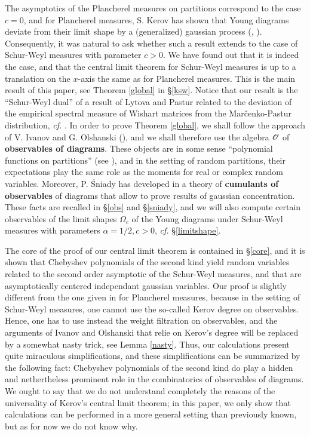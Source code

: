\documentclass[10pt]{amsart}
\begin{document}
The asymptotics of the Plancherel measures on partitions correspond to the case $c=0$, and for Plancherel measures, S. Kerov has shown that Young diagrams deviate from their limit shape by a (generalized) gaussian process (\cite{Ker93}, \cite{IO02}). Consequently, it was natural to ask whether such a result extends to the case of Schur-Weyl measures with parameter $c>0$. We have found out that it is indeed the case, and that the central limit theorem for Schur-Weyl measures is up to a translation on the $x$-axis the same as for Plancherel measures. This is the main result of this paper, see Theorem \ref{global} in \S\ref{ksw}. Notice that our result is the ``Schur-Weyl dual'' of a result of Lytova and Pastur related to the deviation of the empirical spectral measure of Wishart matrices from the Mar\v{c}enko-Pastur distribution, \emph{cf.} \cite{LP09}. In order to prove Theorem \ref{global}, we shall follow the approach of V. Ivanov and G. Olshanski (\cite{IO02}), and we shall therefore use the algebra $\mathscr{O}$ of \textbf{observables of diagrams}. These objects are in some sense ``polynomial functions on partitions'' (see \cite{KO94}), and in the setting of random partitions, their expectations play the same role as the moments for real or complex random variables. Moreover, P. \'Sniady has developed in \cite{Sni06} a theory of \textbf{cumulants of observables} of diagrams that allow to prove results of gaussian concentration. These facts are recalled in \S\ref{obs} and \S\ref{sniady}, and we will also compute certain observables of the limit shapes $\Omega_{c}$ of the Young diagrams under Schur-Weyl measures with parameters $\alpha=1/2,c>0$, \emph{cf.} \S\ref{limitshape}.\bigskip

The core of the proof of our central limit theorem is contained in \S\ref{core}, and it is shown that Chebyshev polynomials of the second kind yield random variables related to the second order asymptotic of the Schur-Weyl measures, and that are asymptotically centered independant gaussian variables. Our proof is slightly different from the one given in \cite[\S7]{IO02} for Plancherel measures, because in the setting of Schur-Weyl measures, one cannot use the so-called Kerov degree on observables. Hence, one has to use instead the weight filtration on observables, and the arguments of Ivanov and Olshanski that relie on Kerov's degree will be replaced by a somewhat nasty trick, see Lemma \ref{nasty}. Thus, our calculations present quite miraculous simplifications, and these simplifications can be summarized by the following fact: Chebyshev polynomials of the second kind do play a hidden and nethertheless prominent role in the combinatorics of observables of diagrams. We ought to say that we do not understand completely the reasons of the universality of Kerov's central limit theorem; in this paper, we only show that calculations can be performed in a more general setting than previously known, but as for now we do not know why.\bigskip\bigskip
\end{document}
